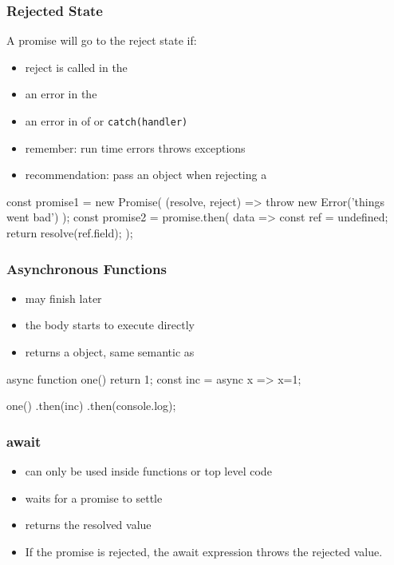 \begin{frame}[fragile] \frametitle{Rejected State}
A promise will go to the reject state if:
\begin{itemize}
  \item reject is called in the 
  \item {} an error in the 
  \item {} an error in   of  or {\tt catch(handler)}
  \item remember: run time errors throws exceptions
  \item recommendation: pass an  object when rejecting a 
\end{itemize}
\vspace{0mm}
\begin{CodeBox}{}
const promise1 = new Promise(
  (resolve, reject) => throw new Error('things went bad')
);
const promise2 = promise.then( data => {
    const ref = undefined;
    return resolve(ref.field);
});
\end{CodeBox}
\end{frame}

\begin{frame}[fragile] \frametitle{Asynchronous Functions}
\begin{itemize}
  \item may finish later
  \item the body starts to execute directly
  \item returns a  object, same semantic as 
\end{itemize}
\vspace{5mm}
\begin{CodeBox}{}
async function one() {
  return 1;
}
const inc = async x => x=1;

one()
.then(inc)
.then(console.log);
\end{CodeBox}
\end{frame}

\begin{frame}[fragile] \frametitle{await}
\begin{itemize}
  \item can only be used inside  functions or top level code
  \item waits for a promise to settle
  \item returns the resolved value
  \item If the promise is rejected, the await expression throws the rejected value.
\end{itemize}
\end{frame}

